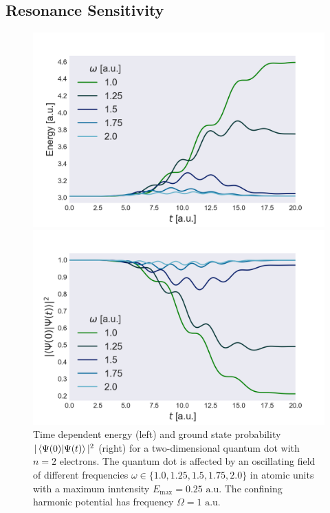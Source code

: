 \subsection{Resonance Sensitivity}

\begin{figure}
    \centering
    \begin{minipage}{0.49\textwidth}
        \includegraphics[trim=2em 0em 5em 0em, width=\textwidth]{results/figures/2D/resonance/n2resonance.png} 
    \end{minipage}\hfill
    \begin{minipage}{0.49\textwidth}
        \includegraphics[trim=0em 0em 5em 0em, width=\textwidth]{results/figures/2D/resonance/n2overlap_res.png} 
    \end{minipage}
    \caption{Time dependent energy (left) and ground state probability $|\braket{\Psi(0)}{\Psi(t)}|^2$
        (right) for a two-dimensional quantum dot with $n=2$ electrons. The quantum dot 
        is affected by an oscillating field of different frequencies
        $\omega\in\{1.0, 1.25, 1.5, 1.75, 2.0\}$ in atomic units with a maximum inntensity
        $E_\text{max} = 0.25 \text{ a.u.}$ The confining harmonic potential has frequency
        $\Omega=1 \text{ a.u.}$
    }
    \label{fig:2d_resonance_n2}
\end{figure}

